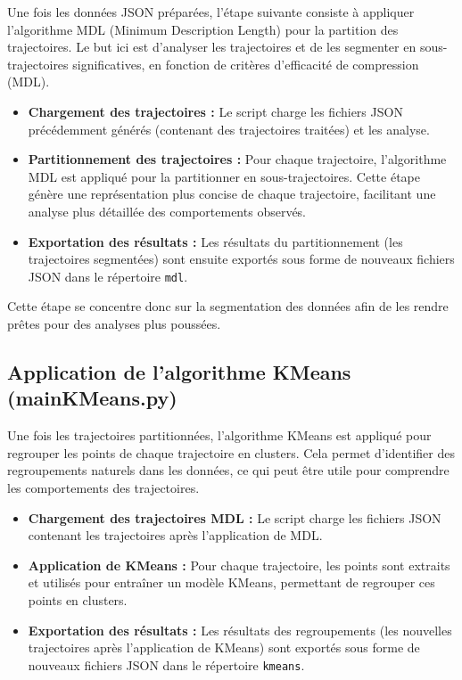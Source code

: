 \documentclass{article}
\begin{document}
        Une fois les données JSON préparées, l'étape suivante consiste à appliquer l'algorithme MDL (Minimum Description Length) pour la partition des trajectoires. Le but ici est d'analyser les trajectoires et de les segmenter en sous-trajectoires significatives, en fonction de critères d'efficacité de compression (MDL).
        
        \begin{itemize}
            \item \textbf{Chargement des trajectoires :} Le script charge les fichiers JSON précédemment générés (contenant des trajectoires traitées) et les analyse.
            \item \textbf{Partitionnement des trajectoires :} Pour chaque trajectoire, l'algorithme MDL est appliqué pour la partitionner en sous-trajectoires. Cette étape génère une représentation plus concise de chaque trajectoire, facilitant une analyse plus détaillée des comportements observés.
            \item \textbf{Exportation des résultats :} Les résultats du partitionnement (les trajectoires segmentées) sont ensuite exportés sous forme de nouveaux fichiers JSON dans le répertoire \texttt{mdl}.
        \end{itemize}
        
        Cette étape se concentre donc sur la segmentation des données afin de les rendre prêtes pour des analyses plus poussées.
        
        \subsection{Application de l'algorithme KMeans (mainKMeans.py)}
        
        Une fois les trajectoires partitionnées, l'algorithme KMeans est appliqué pour regrouper les points de chaque trajectoire en clusters. Cela permet d'identifier des regroupements naturels dans les données, ce qui peut être utile pour comprendre les comportements des trajectoires.
        
        \begin{itemize}
            \item \textbf{Chargement des trajectoires MDL :} Le script charge les fichiers JSON contenant les trajectoires après l'application de MDL.
            \item \textbf{Application de KMeans :} Pour chaque trajectoire, les points sont extraits et utilisés pour entraîner un modèle KMeans, permettant de regrouper ces points en clusters.
            \item \textbf{Exportation des résultats :} Les résultats des regroupements (les nouvelles trajectoires après l'application de KMeans) sont exportés sous forme de nouveaux fichiers JSON dans le répertoire \texttt{kmeans}.
        \end{itemize}
        
\end{document}
